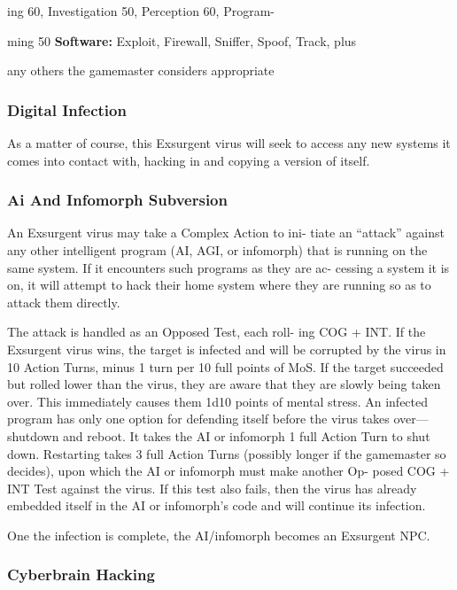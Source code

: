 ing 60, Investigation 50, Perception 60, Program-

ming 50
\textbf{Software:} Exploit, Firewall, Sniffer, Spoof, Track, plus 

any others the gamemaster considers appropriate

\subsubsection{Digital Infection}

As a matter of course, this Exsurgent virus will seek 
to access any new systems it comes into contact with, 
hacking in and copying a version of itself.

\subsubsection{Ai And Infomorph Subversion}

An Exsurgent virus may take a Complex Action to ini-
tiate an ``attack'' against any other intelligent program 
(AI, AGI, or infomorph) that is running on the same 
system. If it encounters such programs as they are ac-
cessing a system it is on, it will attempt to hack their 
home system where they are running so as to attack 
them directly. 

The attack is handled as an Opposed Test, each roll-
ing COG + INT. If the Exsurgent virus wins, the target 
is infected and will be corrupted by the virus in 10 
Action Turns, minus 1 turn per 10 full points of MoS. 
If the target succeeded but rolled lower than the virus, 
they are aware that they are slowly being taken over. 
This immediately causes them 1d10 points of mental 
stress. An infected program has only one option for 
defending itself before the virus takes over—shutdown 
and reboot. It takes the AI or infomorph 1 full Action 
Turn to shut down. Restarting takes 3 full Action Turns 
(possibly longer if the gamemaster so decides), upon 
which the AI or infomorph must make another Op-
posed COG + INT Test against the virus. If this test also 
fails, then the virus has already embedded itself in the 
AI or infomorph's code and will continue its infection.

One the infection is complete, the AI/infomorph 
becomes an Exsurgent NPC.

\subsubsection{Cyberbrain Hacking}

